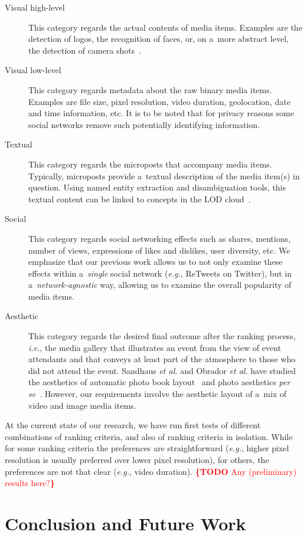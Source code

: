 \documentclass[runningheads,a4paper,11pt]{llncs}
\newcommand{\todo}[1]{\noindent\textcolor{red}{{\bf \{TODO} #1{\bf \}}}}
\begin{document}
\begin{description}
\item[Visual high-level]
This category regards the actual contents of media items.
Examples are the detection of logos, the recognition of faces, or, on a~more abstract level,
the detection of camera shots~\cite{Crowdsourcing2011}.

\item[Visual low-level]
This category regards metadata about the raw binary media items.
Examples are file size, pixel resolution, video duration, geolocation,
date and time information, etc.
It is to be noted that for privacy reasons some social networks
remove such potentially identifying information.

\item[Textual]
This category regards the microposts that accompany media items.
Typically, microposts provide a~textual description of the media item(s) in question.
Using named entity extraction and disambiguation tools,
this textual content can be linked to concepts in the LOD cloud~\cite{Facebook2011}.

\item[Social]
This category regards social networking effects such as shares, mentions,
number of views, expressions of likes and dislikes, user diversity, etc.
We emphasize that our previous work allows us
to not only examine these effects within a~\emph{single} social network (\emph{e.g.}, ReTweets on Twitter),
but in a~\emph{network-agnostic} way, allowing us
to examine the overall popularity of media items.

\item[Aesthetic]
This category regards the desired final outcome after the ranking process, \emph{i.e.},
the media gallery that illustrates an event from the view of event attendants and
that conveys at least part of the atmosphere to those who did not attend the event.
Sandhaus \emph{et al.} and Obrador \emph{et al.} have studied the aesthetics of
automatic photo book layout~\cite{Photo2011}
and photo aesthetics \emph{per se}~\cite{Photo2012}.
However, our requirements involve the aesthetic layout of a~mix of video and image media items.
\end{description}

\noindent At the current state of our research, we have run first tests of different combinations
of ranking criteria, and also of ranking criteria in isolation.
While for some ranking criteria the preferences are straightforward
(\emph{e.g.}, higher pixel resolution is usually preferred over lower pixel resolution),
for others, the preferences are not that clear (\emph{e.g.}, video duration).
\todo{Any (preliminary) results here?}


\section{Conclusion and Future Work}

\renewcommand{\ttdefault}{cmvtt}
\renewcommand\UrlFont\tt



\end{document}
